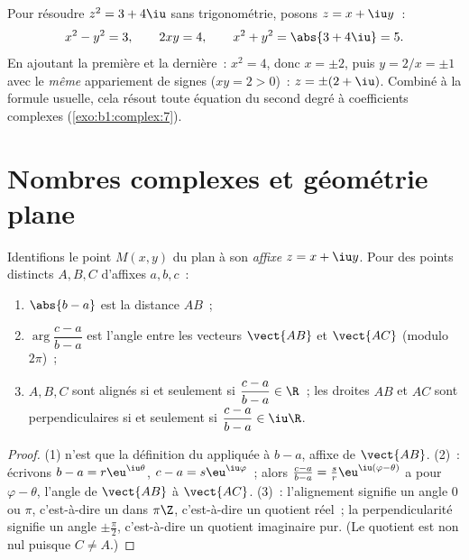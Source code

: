 \begin{example}\label{ex:b1:complex:sqrt}
Pour résoudre $z^2 = 3 + 4\iu$ sans trigonométrie, posons $z = x +
\iu y$~:
\[
x^2 - y^2 = 3, \qquad 2xy = 4, \qquad x^2 + y^2 = \abs{3 + 4\iu} = 5 .
\]
En ajoutant la première et la dernière~: $x^2 = 4$, donc $x = \pm 2$,
puis $y = 2/x = \pm 1$ avec le \emph{même} appariement de signes ($xy
= 2 > 0$)~: $z = \pm(2 + \iu)$. Combiné à la formule usuelle, cela
résout toute équation du second degré à coefficients complexes
(\cref{exo:b1:complex:7}).
\end{example}

\section{Nombres complexes et géométrie plane}

\begin{proposition}\label{prop:b1:complex:geometry}
Identifions le point $M(x, y)$ du plan à son \emph{affixe} $z = x +
\iu y$. Pour des points distincts $A, B, C$ d'affixes
$a, b, c$~:
\begin{enumerate}
  \item $\abs{b - a}$ est la distance $AB$~;
  \item $\arg\dfrac{c - a}{b - a}$ est l'angle entre les vecteurs
        $\vect{AB}$ et $\vect{AC}$ (modulo $2\pi$)~;
  \item $A, B, C$ sont alignés si et seulement si $\dfrac{c - a}{b -
        a} \in \R$~; les droites $AB$ et $AC$ sont perpendiculaires si
        et seulement si $\dfrac{c - a}{b - a} \in \iu\R$.
\end{enumerate}
\end{proposition}

\begin{proof}
(1) n'est que la définition du  appliquée à $b - a$, affixe de
$\vect{AB}$. (2)~: écrivons $b - a = r\eu^{\iu\theta}$, $c - a =
s\eu^{\iu\varphi}$~; alors $\frac{c-a}{b-a} = \frac sr
\eu^{\iu(\varphi - \theta)}$ a pour  $\varphi - \theta$,
l'angle de $\vect{AB}$ à $\vect{AC}$. (3)~: l'alignement signifie un
angle $0$ ou $\pi$, c'est-à-dire un  dans $\pi\Z$,
c'est-à-dire un quotient réel~; la perpendicularité signifie un angle
$\pm\frac\pi2$, c'est-à-dire un quotient imaginaire pur. (Le quotient
est non nul puisque $C \neq A$.)
\end{proof}

